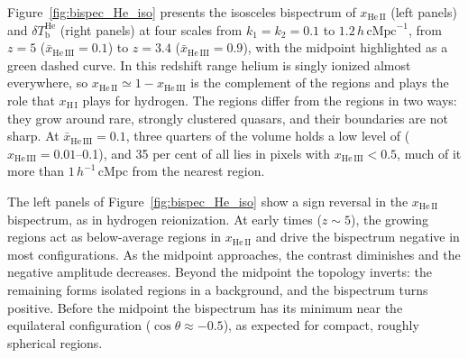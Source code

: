 
    \caption{Redshift evolution of the isosceles bispectrum $\tilde{B}_\mathrm{iso}(k_1, k_2, \theta)$, $k_1 = k_2$, for the singly ionized helium fraction $x_\mathrm{He\,II}$ (left panels) and the 3.46\,cm brightness temperature $\delta T_\mathrm{b}^\mathrm{He}$ (right panels, gas-cell maps), at $k_1 = k_2 = 0.1$, $0.2$, $0.4$ and $1.2\,h\,\mathrm{cMpc}^{-1}$ (top to bottom). Colors indicate redshift from $z = 5$ (dark purple) to $z = 3.4$ (yellow), corresponding to $\bar{x}_\mathrm{He\,III}$ increasing from $0.1$ to $0.9$, with the dashed curve marking the midpoint ($\bar{x}_\mathrm{He\,III} = 0.5$). The left panels use a symmetric logarithmic scale and the right panels a linear scale; the $\delta T_\mathrm{b}^\mathrm{He}$ bispectrum is positive for every configuration. The vertical dashed line marks the equilateral configuration at $\cos\theta = -0.5$.}



Figure~\ref{fig:bispec_He_iso} presents the isosceles bispectrum of $x_\mathrm{He\,II}$ (left panels) and $\delta T_\mathrm{b}^\mathrm{He}$ (right panels) at four scales from $k_1 = k_2 = 0.1$ to $1.2\,h\,\mathrm{cMpc}^{-1}$, from $z = 5$ ($\bar{x}_\mathrm{He\,III} = 0.1$) to $z = 3.4$ ($\bar{x}_\mathrm{He\,III} = 0.9$), with the midpoint highlighted as a green dashed curve. In this redshift range helium is singly ionized almost everywhere, so $x_\mathrm{He\,II} \simeq 1 - x_\mathrm{He\,III}$ is the complement of the  regions and plays the role that $x_\mathrm{H\,I}$ plays for hydrogen. The  regions differ from the  regions in two ways: they grow around rare, strongly clustered quasars, and their boundaries are not sharp. At $\bar{x}_\mathrm{He\,III} = 0.1$, three quarters of the volume holds a low level of  ($x_\mathrm{He\,III} = 0.01$--0.1), and 35 per cent of all  lies in pixels with $x_\mathrm{He\,III} < 0.5$, much of it more than $1\,h^{-1}\,\mathrm{cMpc}$ from the nearest  region.

The left panels of Figure~\ref{fig:bispec_He_iso} show a sign reversal in the $x_\mathrm{He\,II}$ bispectrum, as in hydrogen reionization. At early times ($z \sim 5$), the growing  regions act as below-average regions in $x_\mathrm{He\,II}$ and drive the bispectrum negative in most configurations. As the midpoint approaches, the contrast diminishes and the negative amplitude decreases. Beyond the midpoint the topology inverts: the remaining  forms isolated regions in a  background, and the bispectrum turns positive. Before the midpoint the bispectrum has its minimum near the equilateral configuration ($\cos\theta \approx -0.5$), as expected for compact, roughly spherical  regions.

